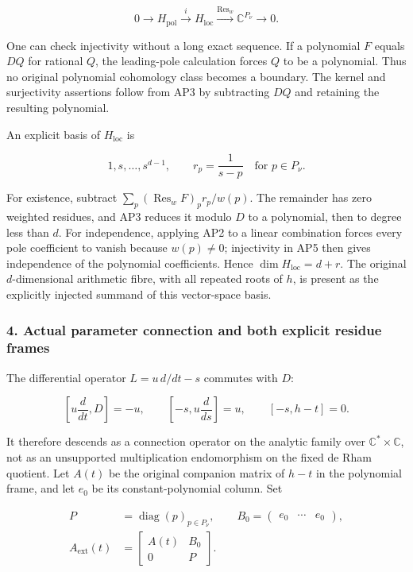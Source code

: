 \[
0\longrightarrow H_{\mathrm{pol}}\xrightarrow{i}H_{\mathrm{loc}}
\xrightarrow{\operatorname{Res}_w}\mathbb C^{P_\nu}\longrightarrow0.
\tag{AP5}
\]

One can check injectivity without a long exact sequence. If a polynomial \(F\) equals \(DQ\) for rational \(Q\), the leading-pole calculation forces \(Q\) to be a polynomial. Thus no original polynomial cohomology class becomes a boundary. The kernel and surjectivity assertions follow from AP3 by subtracting \(DQ\) and retaining the resulting polynomial.

An explicit basis of \(H_{\mathrm{loc}}\) is

\[
1,s,\ldots,s^{d-1},\qquad r_p=\frac{1}{s-p}
\quad\text{for }p\in P_\nu.
\tag{AP6}
\]

For existence, subtract \(\sum_p (\operatorname{Res}_w F)_p r_p/w(p)\). The remainder has zero weighted residues, and AP3 reduces it modulo \(D\) to a polynomial, then to degree less than \(d\). For independence, applying AP2 to a linear combination forces every pole coefficient to vanish because \(w(p)\ne0\); injectivity in AP5 then gives independence of the polynomial coefficients. Hence \(\dim H_{\mathrm{loc}}=d+r\). The original \(d\)-dimensional arithmetic fibre, with all repeated roots of \(h\), is present as the explicitly injected summand of this vector-space basis.

\subsubsection{4. Actual parameter connection and both explicit residue frames}\label{endpoint-analytic_pole--actual-parameter-connection-and-both-explicit-residue-frames}

The differential operator \(L=u\,d/dt-s\) commutes with \(D\):

\[
\left[u\frac{d}{dt},D\right]=-u,\qquad
\left[-s,u\frac{d}{ds}\right]=u,\qquad [-s,h-t]=0.
\tag{AP7}
\]

It therefore descends as a connection operator on the analytic family over \(\mathbb{C}^{*}\times\mathbb{C}\), not as an unsupported multiplication endomorphism on the fixed de Rham quotient. Let \(A(t)\) be the original companion matrix of \(h-t\) in the polynomial frame, and let \(e_0\) be its constant-polynomial column. Set

\[
\begin{aligned}
P&=\operatorname{diag}(p)_{p\in P_\nu},\qquad
B_0=\begin{pmatrix}e_0&\cdots&e_0\end{pmatrix},\\
A_{\mathrm{ext}}(t)&=\begin{bmatrix}A(t)&B_0\\0&P\end{bmatrix}.
\end{aligned}
\tag{AP8}
\]

